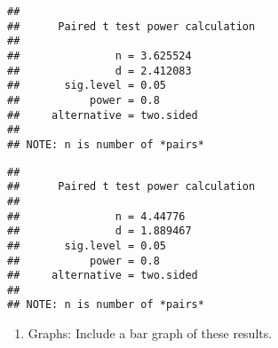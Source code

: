 \documentclass[
]{article}
\newenvironment{Shaded}{\begin{snugshade}}{\end{snugshade}}
\newcommand{\CommentTok}[1]{\textcolor[rgb]{0.56,0.35,0.01}{\textit{#1}}}
\newcommand{\DataTypeTok}[1]{\textcolor[rgb]{0.13,0.29,0.53}{#1}}
\newcommand{\FloatTok}[1]{\textcolor[rgb]{0.00,0.00,0.81}{#1}}
\newcommand{\KeywordTok}[1]{\textcolor[rgb]{0.13,0.29,0.53}{\textbf{#1}}}
\newcommand{\NormalTok}[1]{#1}
\newcommand{\OperatorTok}[1]{\textcolor[rgb]{0.81,0.36,0.00}{\textbf{#1}}}
\newcommand{\OtherTok}[1]{\textcolor[rgb]{0.56,0.35,0.01}{#1}}
\newcommand{\StringTok}[1]{\textcolor[rgb]{0.31,0.60,0.02}{#1}}
\providecommand{\tightlist}{%
  \setlength{\itemsep}{0pt}\setlength{\parskip}{0pt}}
\begin{document}
\begin{Shaded}
\end{Shaded}

\begin{verbatim}
## 
##      Paired t test power calculation 
## 
##               n = 3.625524
##               d = 2.412083
##       sig.level = 0.05
##           power = 0.8
##     alternative = two.sided
## 
## NOTE: n is number of *pairs*
\end{verbatim}

\begin{Shaded}
\end{Shaded}

\begin{verbatim}
## 
##      Paired t test power calculation 
## 
##               n = 4.44776
##               d = 1.889467
##       sig.level = 0.05
##           power = 0.8
##     alternative = two.sided
## 
## NOTE: n is number of *pairs*
\end{verbatim}

\begin{enumerate}
\def\labelenumi{\arabic{enumi})}
\setcounter{enumi}{8}
\tightlist
\item
  Graphs: Include a bar graph of these results.
\end{enumerate}
\end{document}
